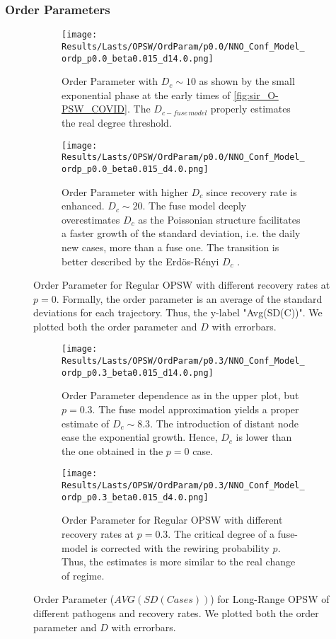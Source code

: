 \documentclass[a4paper,10pt, oneside]{book} %
\theoremstyle{definition}
\begin{document}
\clearpage
\restoregeometry
\subsubsection*{Order Parameters}
\begin{figure}[t]
	\begin{subfigure}[t]{0.48\linewidth}
		\centering
		\texttt{[image: Results/Lasts/OPSW/OrdParam/p0.0/NNO\_Conf\_Model\_ordp\_p0.0\_beta0.015\_d14.0.png]} 
		\caption{Order Parameter with $D_c \sim 10$ as shown by the small exponential phase at the early times of \autoref{fig:sir_O-PSW_COVID}. The $ D_{c-fuse\, model}$ properly estimates the real degree threshold.}
		\label{fig:Ordp_OPSW_COVID19_D14}
	\end{subfigure}
	\hfill
	\begin{subfigure}[t]{0.48\linewidth}
		\centering
		\texttt{[image: Results/Lasts/OPSW/OrdParam/p0.0/NNO\_Conf\_Model\_ordp\_p0.0\_beta0.015\_d4.0.png]}
		\caption{Order Parameter with higher $D_c$ since recovery rate is enhanced. $D_c \sim 20$.
		The fuse model deeply overestimates $ D_c$ as the Poissonian structure facilitates a faster growth of the standard deviation, i.e. the daily new cases, more than a fuse one. The transition is better described by the Erdös-Rényi $ D_c$ .}
		\label{fig:Ordp_OPSW_highmu_COVID19}
	\end{subfigure}
	\caption{Order Parameter for Regular OPSW with different recovery rates at $p = 0$. Formally, the order parameter is an average of the standard deviations for each trajectory. Thus, the y-label "Avg(SD(C))". We plotted both the order parameter and $D$ with errorbars.}
	\label{fig:Ordp_OPSW_COVID19_panel}
\end{figure}

\begin{figure}[t]
	\begin{subfigure}[t]{0.48\linewidth}
		\texttt{[image: Results/Lasts/OPSW/OrdParam/p0.3/NNO\_Conf\_Model\_ordp\_p0.3\_beta0.015\_d14.0.png]}
		\caption{Order Parameter dependence as in the upper plot, but $ p = 0.3$. The fuse model approximation yields a proper estimate of $ D_c \sim 8.3$. The introduction of distant node ease the exponential growth. Hence, $ D_c$ is lower than the one obtained in the $ p = 0$ case.}
		\label{fig:Ordp_OPSW_Dc8.3_p0.3}
	\end{subfigure}
	\hfill
	\begin{subfigure}[t]{0.48\linewidth}
		\texttt{[image: Results/Lasts/OPSW/OrdParam/p0.3/NNO\_Conf\_Model\_ordp\_p0.3\_beta0.015\_d4.0.png]}
		\caption{Order Parameter for Regular OPSW with different recovery rates at $p = 0.3$.
		The critical degree of a fuse-model is corrected with the rewiring probability $ p$. Thus, the estimates is more similar to the real change of regime.}
		\label{fig:Ordp_OPSW_highmu_p0.3}
	\end{subfigure}
	\caption{Order Parameter ($ AVG(SD(Cases)) $) for Long-Range OPSW of different pathogens and recovery rates. We plotted both the order parameter and $D$ with errorbars.}
	\label{fig:Ordp_OPSW_COVID19_p0.3_panel}
\end{figure}
\end{document}
